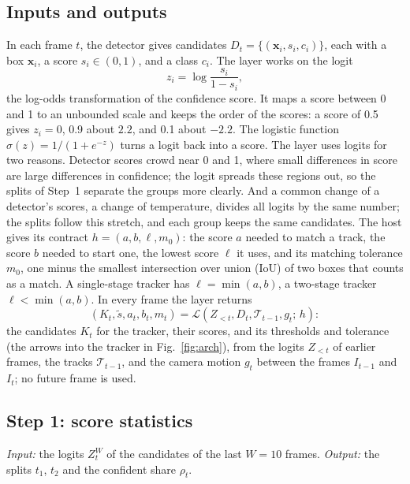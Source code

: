 \subsection{Inputs and outputs}\label{sec:problem}
In each frame $t$, the detector gives candidates $D_t=\{(\mathbf{x}_i,s_i,c_i)\}$, each with a box
$\mathbf{x}_i$, a score $s_i\in(0,1)$, and a class $c_i$. The layer works on the logit
\begin{equation}
z_i=\log\frac{s_i}{1-s_i},
\label{eq:logit}
\end{equation}
the log-odds transformation of the confidence score. It maps a score between 0 and 1 to an
unbounded scale and keeps the order of the scores: a score of 0.5 gives $z_i=0$, 0.9 about $2.2$,
and 0.1 about $-2.2$. The logistic function $\sigma(z)=1/(1+e^{-z})$ turns a logit back into a
score. The layer uses logits for two reasons. Detector scores crowd near 0 and 1, where small
differences in score are large differences in confidence; the logit spreads these regions out, so
the splits of Step~1 separate the groups more clearly. And a common change of a detector's scores,
a change of temperature, divides all logits by the same number; the splits follow this stretch,
and each group keeps the same candidates. The host gives its contract $h=(a,b,\ell,m_0)$: the score $a$ needed to match a track, the
score $b$ needed to start one, the lowest score $\ell$ it uses, and its matching tolerance $m_0$,
one minus the smallest intersection over union (IoU) of two boxes that counts as a match. A
single-stage tracker has $\ell=\min(a,b)$, a two-stage tracker $\ell<\min(a,b)$. In every frame
the layer returns
\begin{equation}
\left(K_t,\tilde{s},a_t,b_t,m_t\right)=
\mathcal{L}\left(Z_{<t},D_t,\mathcal{T}_{t-1},g_t;\,h\right):
\label{eq:layer}
\end{equation}
the candidates $K_t$ for the tracker, their scores, and its thresholds and tolerance (the arrows
into the tracker in Fig.~\ref{fig:arch}), from the logits $Z_{<t}$ of earlier frames, the tracks
$\mathcal{T}_{t-1}$, and the camera motion $g_t$ between the frames $I_{t-1}$ and $I_t$; no future
frame is used.

\subsection{Step 1: score statistics}\label{sec:calib}
\emph{Input:} the logits $Z_t^W$ of the candidates of the last $W=10$ frames. \emph{Output:} the
splits $t_1$, $t_2$ and the confident share $\rho_t$.

